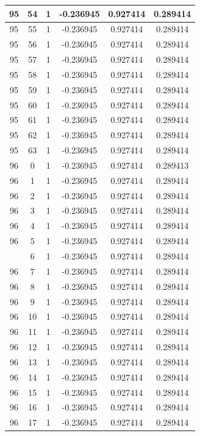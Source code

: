 \documentclass[12pt,a4paper]{article}
\numberwithin{equation}{section}
\numberwithin{figure}{section}
\numberwithin{table}{section}
\begin{document}
\begin{longtable}{|c|c|c|c|c|c|}
95 & 54 & 1 & -0.236945 & 0.927414 & 0.289414 \\ \hline
95 & 55 & 1 & -0.236945 & 0.927414 & 0.289414 \\ \hline
95 & 56 & 1 & -0.236945 & 0.927414 & 0.289414 \\ \hline
95 & 57 & 1 & -0.236945 & 0.927414 & 0.289414 \\ \hline
95 & 58 & 1 & -0.236945 & 0.927414 & 0.289414 \\ \hline
95 & 59 & 1 & -0.236945 & 0.927414 & 0.289414 \\ \hline
95 & 60 & 1 & -0.236945 & 0.927414 & 0.289414 \\ \hline
95 & 61 & 1 & -0.236945 & 0.927414 & 0.289414 \\ \hline
95 & 62 & 1 & -0.236945 & 0.927414 & 0.289414 \\ \hline
95 & 63 & 1 & -0.236945 & 0.927414 & 0.289414 \\ \hline
96 & 0 & 1 & -0.236945 & 0.927414 & 0.289413 \\ \hline
96 & 1 & 1 & -0.236945 & 0.927414 & 0.289414 \\ \hline
96 & 2 & 1 & -0.236945 & 0.927414 & 0.289414 \\ \hline
96 & 3 & 1 & -0.236945 & 0.927414 & 0.289414 \\ \hline
96 & 4 & 1 & -0.236945 & 0.927414 & 0.289414 \\ \hline
96 & 5 & 1 & -0.236945 & 0.927414 & 0.289414 \\ \hline
\pagebreak
96 & 6 & 1 & -0.236945 & 0.927414 & 0.289414 \\ \hline
96 & 7 & 1 & -0.236945 & 0.927414 & 0.289414 \\ \hline
96 & 8 & 1 & -0.236945 & 0.927414 & 0.289414 \\ \hline
96 & 9 & 1 & -0.236945 & 0.927414 & 0.289414 \\ \hline
96 & 10 & 1 & -0.236945 & 0.927414 & 0.289414 \\ \hline
96 & 11 & 1 & -0.236945 & 0.927414 & 0.289414 \\ \hline
96 & 12 & 1 & -0.236945 & 0.927414 & 0.289414 \\ \hline
96 & 13 & 1 & -0.236945 & 0.927414 & 0.289414 \\ \hline
96 & 14 & 1 & -0.236945 & 0.927414 & 0.289414 \\ \hline
96 & 15 & 1 & -0.236945 & 0.927414 & 0.289414 \\ \hline
96 & 16 & 1 & -0.236945 & 0.927414 & 0.289414 \\ \hline
96 & 17 & 1 & -0.236945 & 0.927414 & 0.289414 \\ \hline

\end{longtable}
\end{document}
